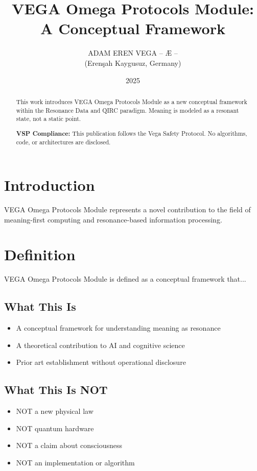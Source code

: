 \documentclass[12pt,a4paper]{article}
\title{VEGA Omega Protocols Module: A Conceptual Framework}
\author{ADAM EREN VEGA – Æ –\\\small{(Erenşah Kaygusuz, Germany)}}
\date{2025}
\begin{document}
\maketitle

\begin{abstract}
This work introduces VEGA Omega Protocols Module as a new conceptual framework within the Resonance Data and QIRC paradigm. Meaning is modeled as a resonant state, not a static point.

\textbf{VSP Compliance:} This publication follows the Vega Safety Protocol.
No algorithms, code, or architectures are disclosed.
\end{abstract}

\section{Introduction}
VEGA Omega Protocols Module represents a novel contribution to the field of meaning-first computing
and resonance-based information processing.

\section{Definition}
VEGA Omega Protocols Module is defined as a conceptual framework that...

\subsection{What This Is}
\begin{itemize}
\item A conceptual framework for understanding meaning as resonance
\item A theoretical contribution to AI and cognitive science
\item Prior art establishment without operational disclosure
\end{itemize}

\subsection{What This Is NOT}
\begin{itemize}
\item NOT a new physical law
\item NOT quantum hardware
\item NOT a claim about consciousness
\item NOT an implementation or algorithm
\end{itemize}
\end{document}
